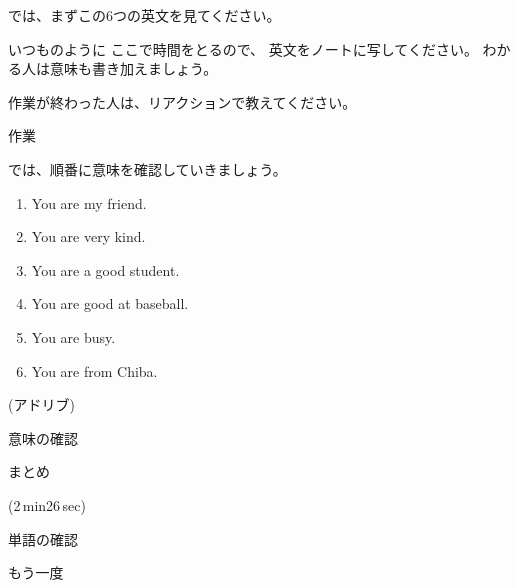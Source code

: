 \documentclass[12pt]{jlreq}
\begin{document}
では、まずこの6つの英文を見てください。

いつものように
ここで時間をとるので、
英文をノートに写してください。
わかる人は意味も書き加えましょう。

作業が終わった人は、リアクションで教えてください。

\hrulefill{}

\hfill{}作業\hfill{}

\hrulefill

では、順番に意味を確認していきましょう。


\begin{enumerate}
 \item You are my friend.
 \item You are very kind.
 \item You are a good student.
 \item You are good at baseball.
 \item You are busy.
 \item You are from Chiba.
\end{enumerate}

(アドリブ)

意味の確認

まとめ

\faVolumeUp{}(2\,min26\,sec)

単語の確認

もう一度
\end{document}
